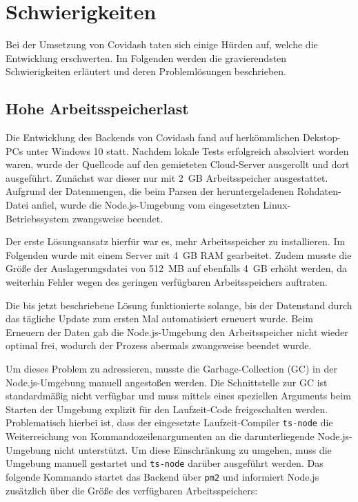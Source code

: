 \documentclass[conference]{IEEEtran}
\begin{document}
\section{Schwierigkeiten}

Bei der Umsetzung von Covidash taten sich einige Hürden auf, welche die Entwicklung erschwerten. Im Folgenden werden die gravierendsten Schwierigkeiten erläutert und deren Problemlösungen beschrieben.



\subsection{Hohe Arbeitsspeicherlast}

Die Entwicklung des Backends von Covidash fand auf herkömmlichen Dekstop-PCs unter Windows 10 statt. Nachdem lokale Tests erfolgreich absolviert worden waren, wurde der Quellcode auf den gemieteten Cloud-Server ausgerollt und dort ausgeführt. Zunächst war dieser nur mit 2~GB Arbeitsspeicher ausgestattet. Aufgrund der Datenmengen, die beim Parsen der heruntergeladenen Rohdaten-Datei anfiel, wurde die Node.js-Umgebung vom eingesetzten Linux-Betriebssystem zwangsweise beendet.

Der erste Lösungsansatz hierfür war es, mehr Arbeitsspeicher zu installieren. Im Folgenden wurde mit einem Server mit 4~GB RAM gearbeitet. Zudem musste die Größe der Auslagerungsdatei von 512~MB auf ebenfalls 4~GB erhöht werden, da weiterhin Fehler wegen des geringen verfügbaren Arbeitsspeichers auftraten.

Die bis jetzt beschriebene Lösung funktionierte solange, bis der Datenstand durch das tägliche Update zum ersten Mal automatisiert erneuert wurde. Beim Erneuern der Daten gab die Node.js-Umgebung den Arbeitsspeicher nicht wieder optimal frei, wodurch der Prozess abermals zwangsweise beendet wurde.

Um dieses Problem zu adressieren, musste die Garbage-Collection (GC) in der Node.js-Umgebung manuell angestoßen werden. Die Schnittstelle zur GC ist standardmäßig nicht verfügbar und muss mittels eines speziellen Arguments beim Starten der Umgebung explizit für den Laufzeit-Code freigeschalten werden. Problematisch hierbei ist, dass der eingesetzte Laufzeit-Compiler \texttt{ts-node}\cite{ts-node} die Weiterreichung von Kommandozeilenargumenten an die darunterliegende Node.js-Umgebung nicht unterstützt. Um diese Einschränkung zu umgehen, muss die Umgebung manuell gestartet und \texttt{ts-node} darüber ausgeführt werden. Das folgende Kommando startet das Backend über \texttt{pm2} und informiert Node.js zusätzlich über die Größe des verfügbaren Arbeitsspeichers:
\end{document}
